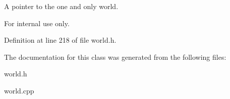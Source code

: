 A pointer to the one and only world. 

\begin{DoxyInternal}{For internal use only.}
\end{DoxyInternal}


Definition at line 218 of file world.h.



The documentation for this class was generated from the following files:\begin{DoxyCompactItemize}
\item 
world.h\item 
world.cpp\end{DoxyCompactItemize}
